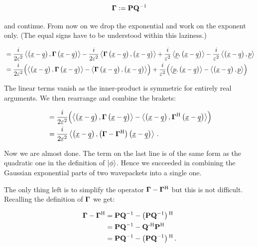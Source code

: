 \begin{equation*}
  \mathbf{\Gamma} := \mathbf{P} \mathbf{Q}{}^{-1}
\end{equation*}

and continue. From now on we drop the exponential and work on the exponent only.
(The equal signs have to be understood within this laziness.)

\begin{align*}
  & =
    \frac{i}{2\varepsilon^2} \left\langle \left( \underline{x}-\underline{q} \right) , \mathbf{\Gamma} \left( \underline{x}-\underline{q} \right) \right\rangle
  - \frac{i}{2\varepsilon^2} \left\langle \mathbf{\Gamma} \left( \underline{x}-\underline{q} \right) , \left( \underline{x}-\underline{q} \right) \right\rangle
  + \frac{i}{\varepsilon^2} \left\langle \underline{p} , \left( \underline{x}-\underline{q} \right) \right\rangle
  - \frac{i}{\varepsilon^2} \left\langle \left( \underline{x}-\underline{q} \right) , \underline{p} \right\rangle \\
  & =
    \frac{i}{2\varepsilon^2} \Bigl( \left\langle \left( \underline{x}-\underline{q} \right) , \mathbf{\Gamma} \left( \underline{x}-\underline{q} \right) \right\rangle - \left\langle \mathbf{\Gamma} \left( \underline{x}-\underline{q} \right) , \left( \underline{x}-\underline{q} \right) \right\rangle \Bigr)
  + \frac{i}{\varepsilon^2} \Bigl( \left\langle \underline{p} , \left( \underline{x}-\underline{q} \right) \right\rangle - \left\langle \left( \underline{x}-\underline{q} \right) , \underline{p} \right\rangle \Bigr)
\end{align*}

The linear terms vanish as the inner-product is symmetric for entirely real arguments.
We then rearrange and combine the brakets:

\begin{align*}
  & =
  \frac{i}{2\varepsilon^2} \Bigl( \left\langle \left( \underline{x}-\underline{q} \right) , \mathbf{\Gamma} \left( \underline{x}-\underline{q} \right) \right\rangle - \left\langle \left( \underline{x}-\underline{q} \right) , \mathbf{\Gamma}{}^{\textnormal{H}} \left( \underline{x}-\underline{q} \right) \right\rangle \Bigr) \\
  & =
  \frac{i}{2\varepsilon^2} \left\langle \left( \underline{x}-\underline{q} \right) , \left(\mathbf{\Gamma} - \mathbf{\Gamma}{}^{\textnormal{H}}\right) \left( \underline{x}-\underline{q} \right) \right\rangle \,.
\end{align*}

Now we are almost done. The term on the last line is of the same form as the
quadratic one in the definition of $\Ket{\phi}$. Hence we succeeded in combining
the Gaussian exponential parts of two wavepackets into a single one.

The only thing left is to simplify the operator $\mathbf{\Gamma} - \mathbf{\Gamma}{}^{\textnormal{H}}$ but this
is not difficult. Recalling the definition of $\mathbf{\Gamma}$ we get:

\begin{align*}
  \mathbf{\Gamma} - \mathbf{\Gamma}{}^{\textnormal{H}}
  & = \mathbf{P} \mathbf{Q}{}^{-1} - \left(\mathbf{P} \mathbf{Q}{}^{-1}\right){}^{\textnormal{H}} \\
  & = \mathbf{P} \mathbf{Q}{}^{-1} - \mathbf{Q}{}^{\textnormal{-H}} \mathbf{P}{}^{\textnormal{H}} \\
  & = \mathbf{P} \mathbf{Q}{}^{-1} - \left(\mathbf{P} \mathbf{Q}{}^{-1}\right){}^{\textnormal{H}} \,.
\end{align*}

